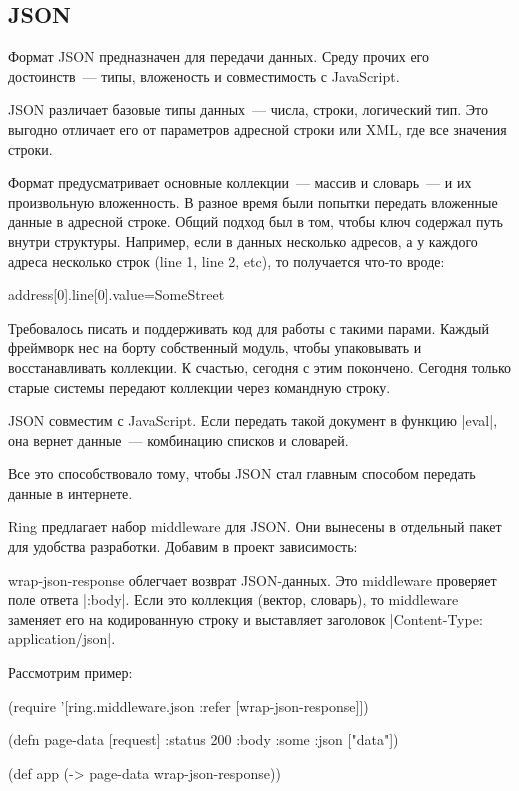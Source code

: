 \subsection{JSON}

Формат JSON предназначен для передачи данных. Среду прочих его достоинств~---
типы, вложеность и совместимость с JavaScript.

JSON различает базовые типы данных~--- числа, строки, логический тип. Это выгодно
отличает его от параметров адресной строки или XML, где все значения строки.

Формат предусматривает основные коллекции~--- массив и словарь~--- и их произвольную
вложенность. В разное время были попытки передать вложенные данные в адресной
строке. Общий подход был в том, чтобы ключ содержал путь внутри
структуры. Например, если в данных несколько адресов, а у каждого адреса
несколько строк (line 1, line 2, etc), то получается что-то вроде:

\begin{code}
address[0].line[0].value=SomeStreet
\end{code}

Требовалось писать и поддерживать код для работы с такими парами. Каждый
фреймворк нес на борту собственный модуль, чтобы упаковывать и восстанавливать
коллекции. К счастью, сегодня с этим покончено. Сегодня только старые системы
передают коллекции через командную строку.

JSON совместим с JavaScript. Если передать такой документ в функцию \spverb|eval|, она
вернет данные~--- комбинацию списков и словарей.

Все это способствовало тому, чтобы JSON стал главным способом передать данные в
интернете.

Ring предлагает набор middleware для JSON. Они вынесены в отдельный пакет для
удобства разработки. Добавим в проект зависимость:

\begin{code}
\end{code}

wrap-json-response облегчает возврат JSON-данных. Это middleware проверяет поле
ответа \spverb|:body|. Если это коллекция (вектор, словарь), то middleware заменяет его
на кодированную строку и выставляет заголовок \spverb|Content-Type: application/json|.


Рассмотрим пример:

\begin{code}
(require '[ring.middleware.json
           :refer [wrap-json-response]])


(defn page-data
  [request]
  {:status 200
   :body {:some {:json ["data"]}}})

(def app
  (-> page-data
      wrap-json-response))
\end{code}

